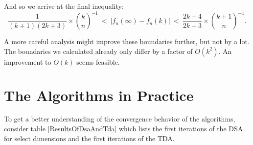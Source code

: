\documentclass[a4paper,11pt]{scrartcl}
\theoremstyle{definition}
\theoremstyle{plain}
\theoremstyle{remark}
\begin{document}
And so we arrive at the final inequality:
\[
\frac{1}{(k+1)(2k+3)} \times \binom{k}{n}^{-1}
\ < \
|f_n(\infty) - f_n(k)|
\ < \
\frac{2k+4}{2k+3} \times \binom{k+1}{n}^{-1}. 
\]

A more careful analysis might improve these boundaries further, but not by a lot.
The boundaries we calculated already only differ by a factor of $O(k^2)$.
An improvement to $O(k)$ seems feasible.

\section{The Algorithms in Practice}

To get a better understanding of the convergence behavior of the algorithms, consider table \ref{ResultsOfDsaAndTda} which lists the first iterations of the DSA for select dimensions and the first iterations of the TDA.
\end{document}
